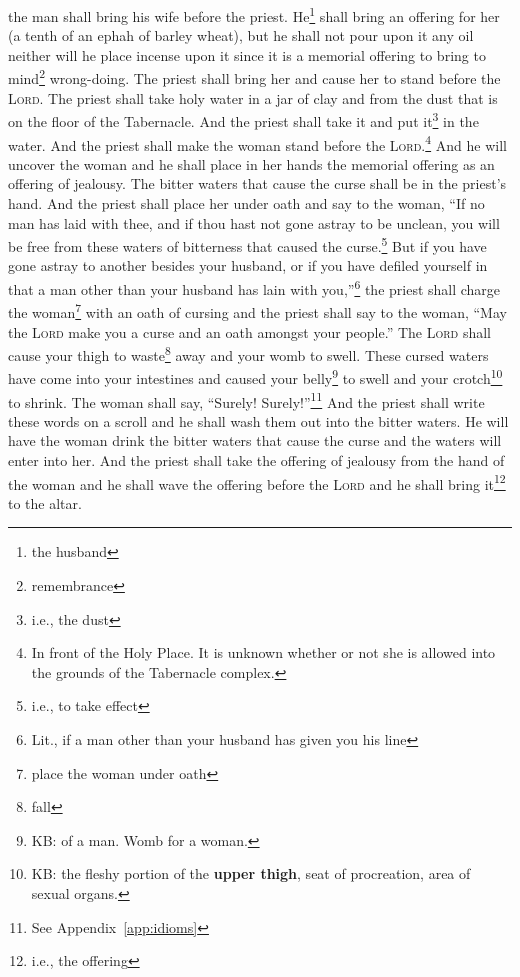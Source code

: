 \begin{inparaenum}
     the man shall bring his wife before the priest. He\footnote{the husband} shall bring an offering for her (a tenth of an ephah of barley wheat), but he shall not pour upon it any oil neither will he place incense upon it since it is a memorial offering to bring to mind\footnote{remembrance} wrong-doing.%
     The priest shall bring her and cause her to stand before the \textsc{Lord}.%
     The priest shall take holy water in a jar of clay and from the dust that is on the floor of the Tabernacle. And the priest shall take it and put it\footnote{i.e., the dust} in the water.%
     And the priest shall make the woman stand before the \textsc{Lord}.\footnote{In front of the Holy Place. It is unknown whether or not she is allowed into the grounds of the Tabernacle complex.} And he will uncover the woman and he shall place in her hands the memorial offering as an offering of jealousy. The bitter waters that cause the curse shall be in the priest's hand.%
     And the priest shall place her under oath and say to the woman, ``If no man has laid with thee, and if thou hast not gone astray to be unclean, you will be free from these waters of bitterness that caused the curse.\footnote{i.e., to take effect}%
     But if you have gone astray to another besides your husband, or if you have defiled yourself in that a man other than your husband has lain with you,''\footnote{Lit., if a man other than your husband has given you his line}%
     the priest shall charge the woman\footnote{place the woman under oath} with an oath of cursing and the priest shall say to the woman, ``May the \textsc{Lord} make you a curse and an oath amongst your people.'' The \textsc{Lord} shall cause your thigh to waste\footnote{fall} away and your womb to swell.%
     These cursed waters have come into your intestines and caused your belly\footnote{KB: of a man. Womb for a woman.} to swell and your crotch\footnote{KB: the fleshy portion of the \textbf{upper thigh}, seat of procreation, area of sexual organs.} to shrink. The woman shall say, ``Surely! Surely!''\footnote{See Appendix~\ref{app:idioms}}%
     And the priest shall write these words on a scroll and he shall wash them out into the bitter waters.%
     He will have the woman drink the bitter waters that cause the curse and the waters will enter into her.%
     And the priest shall take the offering of jealousy from the hand of the woman and he shall wave the offering before the \textsc{Lord} and he shall bring it\footnote{i.e., the offering} to the altar.%

\end{inparaenum}
